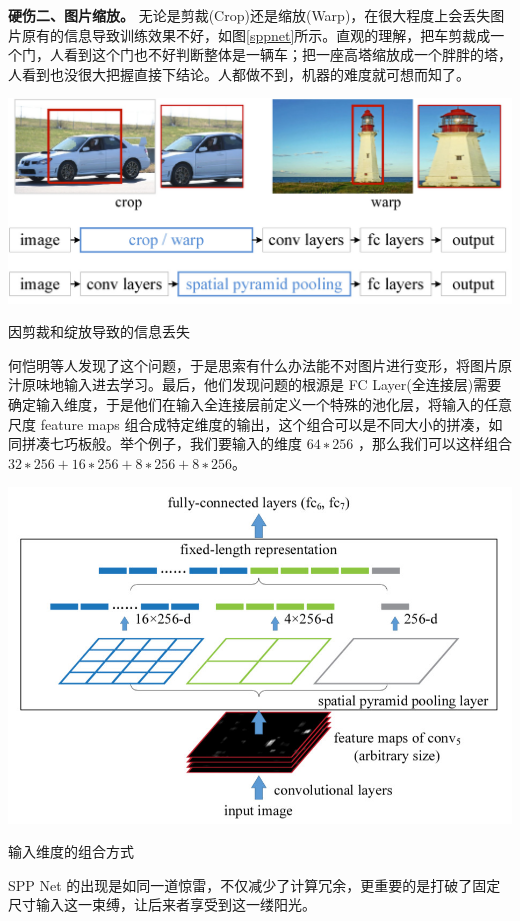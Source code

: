 \textbf{硬伤二、图片缩放。}
无论是剪裁(Crop)还是缩放(Warp)，在很大程度上会丢失图片原有的信息导致训练效果不好，如图\ref{sppnet}所示。直观的理解，把车剪裁成一个门，人看到这个门也不好判断整体是一辆车；把一座高塔缩放成一个胖胖的塔，人看到也没很大把握直接下结论。人都做不到，机器的难度就可想而知了。
\begin{uscfigure}
	\includegraphics[width=\textwidth]{./Pictures/sppnet_crop_warp.jpg}	
	\caption{因剪裁和绽放导致的信息丢失}
	\label{sppnet}
\end{uscfigure}
何恺明等人发现了这个问题，于是思索有什么办法能不对图片进行变形，将图片原汁原味地输入进去学习。最后，他们发现问题的根源是 FC Layer(全连接层)需要确定输入维度，于是他们在输入全连接层前定义一个特殊的池化层，将输入的任意尺度 feature maps 组合成特定维度的输出，这个组合可以是不同大小的拼凑，如同拼凑七巧板般。举个例子，我们要输入的维度 $64∗256$ ，那么我们可以这样组合 $32∗256+16∗256+8∗256+8∗256$。
\begin{uscfigure}
	\includegraphics[width=\textwidth,]{./Pictures/sppnet_pool_layer.jpg}	
	\caption{输入维度的组合方式}
\end{uscfigure}
SPP Net 的出现是如同一道惊雷，不仅减少了计算冗余，更重要的是打破了固定尺寸输入这一束缚，让后来者享受到这一缕阳光。

